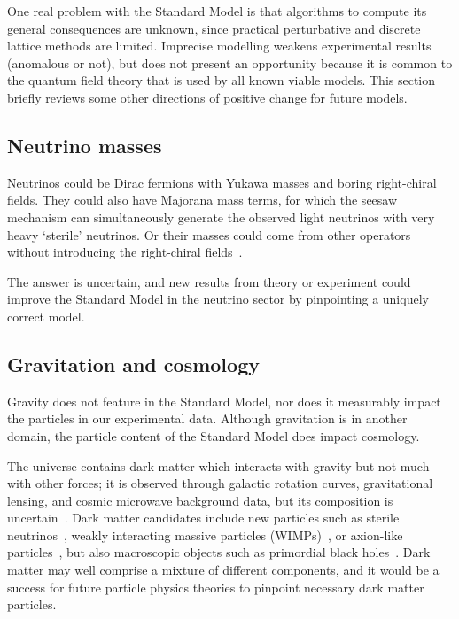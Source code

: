 One real problem with the Standard Model is that algorithms to compute its
general consequences are unknown, since practical perturbative and discrete
lattice methods are limited.
Imprecise modelling weakens experimental results (anomalous or not),
but does not present an opportunity because it is common to the quantum field
theory that is used by all known viable models.
This section briefly reviews some other directions of positive change for
future models.


\subsection{Neutrino masses}
Neutrinos could be Dirac fermions with Yukawa masses and boring right-chiral
fields.
They could also have Majorana mass terms, for which the seesaw mechanism can
simultaneously generate the observed light neutrinos with very heavy `sterile'
neutrinos.
Or their masses could come from other operators without  introducing the
right-chiral fields~\cite{
thomson2013modern,
chala2021neutrino,
wells2020discovery
}.

The answer is uncertain, and new results from theory or experiment could
improve the Standard Model in the neutrino sector
by pinpointing a uniquely correct model.


\subsection{Gravitation and cosmology}
Gravity does not feature in the Standard Model, nor does it measurably impact
the particles in our experimental data.
Although gravitation is in another domain, the particle content of the
Standard Model does impact cosmology.

The universe contains dark matter which interacts with gravity but not much
with other forces; it is observed through galactic rotation curves,
gravitational lensing, and cosmic microwave background data,
but its composition is uncertain~\cite{
begeman1991rotation,
garrett2010dark,
planck2020results
}.
Dark matter candidates include new particles such as
sterile neutrinos~\cite{boyarsky2019sterile},
weakly interacting massive particles (WIMPs)~\cite{jungman1996wimp},
or
axion-like particles~\cite{kim2008axions},
but also macroscopic objects such as
primordial black holes~\cite{bernard2019primordial}.
Dark matter may well comprise a mixture of different components, and it would
be a success for future particle physics theories to pinpoint necessary dark
matter particles.

